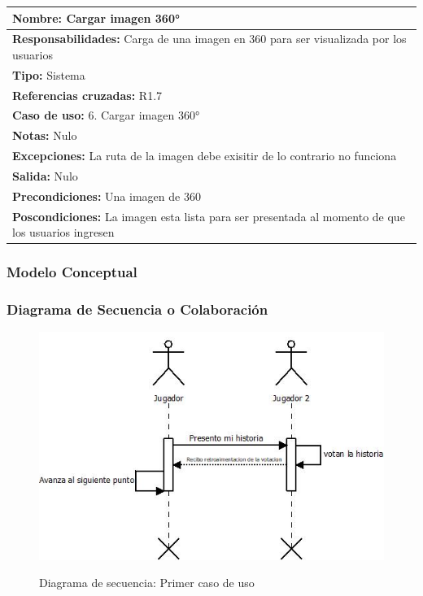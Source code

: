 \begin{table}[H]
    \begin{center}
        \begin{tabular}{| m{15cm} |}          
        	\hline 
        	\textbf{Nombre:} Cargar imagen 360°\\
        	\hline
        	\textbf{Responsabilidades:} Carga de una imagen en 360 para ser visualizada por los usuarios\\
        	\hline
        	\textbf{Tipo:} Sistema\\
        	\hline
        	\textbf{Referencias cruzadas:} R1.7\\
        	\hline
        	\textbf{Caso de uso:} 6. Cargar imagen 360°\\
        	\hline
        	\textbf{Notas:} Nulo\\
        	\hline
        	\textbf{Excepciones:} La ruta de la imagen debe exisitir de lo contrario no funciona\\
        	\hline
        	\textbf{Salida:} Nulo\\
        	\hline
        	\textbf{Precondiciones:} Una imagen de 360 \\
        	\hline
        	\textbf{Poscondiciones:} La imagen esta lista para ser presentada al momento de que los usuarios ingresen\\
        	\hline
        \end{tabular}
    \end{center}
\end{table}

\subsubsection{Modelo Conceptual}
\subsubsection{Diagrama de Secuencia o Colaboración}
\begin{figure}[htbp]
\centering
   \includegraphics[scale=0.9]{imgs/DS_1.jpeg}
   \begin{center}
   Diagrama de secuencia: Primer caso de uso
   \end{center}
\end{figure}

